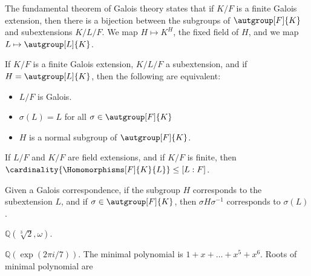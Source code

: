     The fundamental theorem of Galois theory states that if $K/F$ is a
    finite Galois extension, then there is a bijection between the subgroups
    of $\autgroup[F]{K}$ and subextensions $K/L/F$. We map
    $H\mapsto{K}^{H}$, the fixed field of $H$, and we map
    $L\mapsto\autgroup[L]{K}$.
    \begin{theorem}
        If $K/F$ is a finite Galois extension, $K/L/F$ a subextension, and
        if $H=\autgroup[L]{K}$, then the following are equivalent:
        \begin{itemize}
            \item $L/F$ is Galois.
            \item $\sigma(L)=L$ for all $\sigma\in\autgroup[F]{K}$
            \item $H$ is a normal subgroup of $\autgroup[F]{K}$.
        \end{itemize}
    \end{theorem}
    \begin{theorem}
        If $L/F$ and $K/F$ are field extensions, and if $K/F$ is finite,
        then $\cardinality{\Homomorphisms[F]{K}{L}}\leq[L:F]$.
    \end{theorem}
    \begin{theorem}
        Given a Galois correspondence, if the subgroup $H$ corresponds to
        the subextension $L$, and if $\sigma\in\autgroup[F]{K}$, then
        $\sigma{H}\sigma^{\minus{1}}$ corresponds to $\sigma(L)$.
    \end{theorem}
    \begin{example}
        $\mathbb{Q}(\sqrt[3]{2},\omega)$.
    \end{example}
    \begin{example}
        $\mathbb{Q}(\exp(2\pi{i}/7))$. The minimal polynomial is
        $1+x+\dots+x^{5}+x^{6}$. Roots of minimal polynomial are 
    \end{example}
